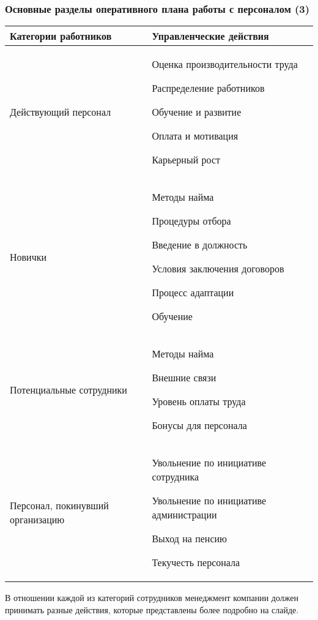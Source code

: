 \documentclass{../industrial-development}
\begin{document}
\begin{frame} \frametitle{Основные разделы оперативного плана работы с персоналом (3)}
	\begin{table}[h]
		\begin{center}
			\begin{tabular}{|p{4cm}|p{5cm}|}
				\hline
				\tiny \textbf{Категории работников} & \tiny \textbf{Управленческие действия} \\
				\hline
				\tiny Действующий персонал & \tiny Оценка производительности труда
				
				Распределение работников
				
				Обучение и развитие
				
				Оплата и мотивация
				
				Карьерный рост
				\\
				\hline
				\tiny Новички & \tiny Методы найма
				
				Процедуры отбора
				
				Введение в должность
				
				Условия заключения договоров
				
				Процесс адаптации
				
				Обучение \\
				\hline
				\tiny Потенциальные сотрудники & \tiny Методы найма
				
				Внешние связи
				
				Уровень оплаты труда
				
				Бонусы для персонала \\
				\hline
				\tiny Персонал, покинувший организацию & \tiny Увольнение по инициативе сотрудника 
				
				Увольнение по инициативе администрации
				
				Выход на пенсию
				
				Текучесть персонала \\
				\hline
			\end{tabular}
		\end{center}
	\end{table}
	
\end{frame}

\lecturenotes

В отношении каждой из категорий сотрудников менеджмент компании должен принимать разные действия, которые представлены более подробно на слайде.
\end{document}
